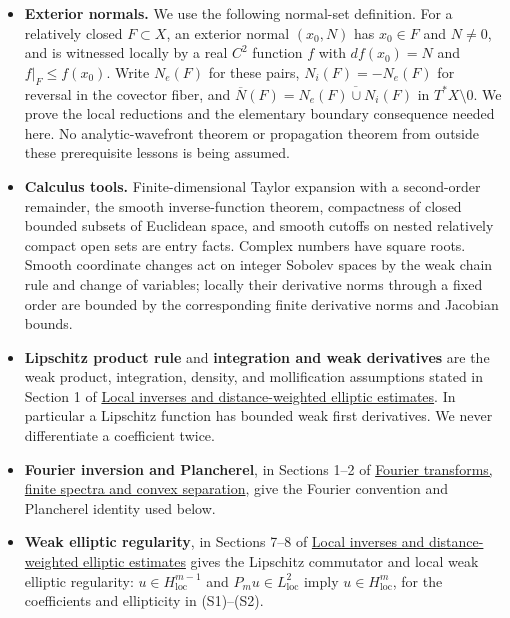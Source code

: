 \documentclass[
  11pt,
]{article}
\providecommand{\tightlist}{%
  \setlength{\itemsep}{0pt}\setlength{\parskip}{0pt}}
\begin{document}
\begin{itemize}
\tightlist
\item
  \textbf{Exterior normals.} We use the following normal-set definition.
  For a relatively closed \(F\subset X\), an exterior normal \((x_0,N)\)
  has \(x_0\in F\) and \(N\ne0\), and is witnessed locally by a real
  \(C^2\) function \(f\) with \(df(x_0)=N\) and \(f|_F\leq f(x_0)\).
  Write \(N_e(F)\) for these pairs, \(N_i(F)=-N_e(F)\) for reversal in
  the covector fiber, and
  \(\overline N(F)=\overline{N_e(F)\cup N_i(F)}\) in \(T^*X\setminus0\).
  We prove the local reductions and the elementary boundary consequence
  needed here. No analytic-wavefront theorem or propagation theorem from
  outside these prerequisite lessons is being assumed.
\item
  \textbf{Calculus tools.} Finite-dimensional Taylor expansion with a
  second-order remainder, the smooth inverse-function theorem,
  compactness of closed bounded subsets of Euclidean space, and smooth
  cutoffs on nested relatively compact open sets are entry facts.
  Complex numbers have square roots. Smooth coordinate changes act on
  integer Sobolev spaces by the weak chain rule and change of variables;
  locally their derivative norms through a fixed order are bounded by
  the corresponding finite derivative norms and Jacobian bounds.
\item
  \textbf{Lipschitz product rule} and \textbf{integration and weak
  derivatives} are the weak product, integration, density, and
  mollification assumptions stated in Section 1 of
  \href{local-elliptic-coefficients.pdf}{Local inverses and
  distance-weighted elliptic estimates}. In particular a Lipschitz
  function has bounded weak first derivatives. We never differentiate a
  coefficient twice.
\item
  \textbf{Fourier inversion and Plancherel}, in Sections 1--2 of
  \href{prerequisite-bridges.pdf}{Fourier transforms, finite spectra and
  convex separation}, give the Fourier convention and Plancherel
  identity used below.
\item
  \textbf{Weak elliptic regularity}, in Sections 7--8 of
  \href{local-elliptic-coefficients.pdf}{Local inverses and
  distance-weighted elliptic estimates} gives the Lipschitz commutator
  and local weak elliptic regularity: \(u\in H^{m-1}_{\mathrm{loc}}\)
  and \(P_mu\in L^2_{\mathrm{loc}}\) imply \(u\in H^m_{\mathrm{loc}}\),
  for the coefficients and ellipticity in (S1)--(S2).
\end{itemize}
\end{document}
